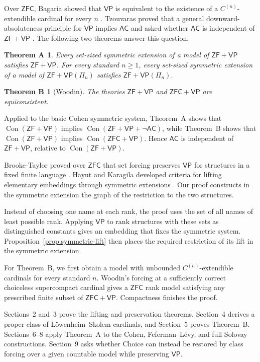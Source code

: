 \documentclass[11pt,a4paper]{amsart}
\newif\ifrevisionblue
\DeclareRobustCommand{\revision}[1]{{\ifrevisionblue\color{blue}\fi#1}}
\newcommand{\VP}{\mathsf{VP}}
\newcommand{\AC}{\mathsf{AC}}
\newcommand{\ZF}{\mathsf{ZF}}
\newcommand{\ZFC}{\mathsf{ZFC}}
\newcommand{\Con}{\operatorname{Con}}
\theoremstyle{plain}
\newtheorem*{thmA}{Theorem A}
\newtheorem*{thmB}{Theorem B}
\theoremstyle{definition}
\theoremstyle{remark}
\begin{document}
Over $\ZFC$, Bagaria showed that $\VP$ is equivalent to the existence of a $C^{(n)}$-extendible cardinal for every $n$ \cite{BagariaCn}.  Tzouvaras proved that a general downward-absoluteness principle for $\VP$ implies $\AC$ and asked whether $\AC$ is independent of $\ZF+\VP$ \cite[Question~4.1]{Tzouvaras}.  The following two theorems answer this question.

\begin{thmA}
Every set-sized symmetric extension of a model of $\ZF+\VP$ satisfies $\ZF+\VP$.  For every standard $n\geq1$, every set-sized symmetric extension of a model of $\ZF+\VP(\Pi_n)$ satisfies $\ZF+\VP(\Pi_n)$.
\end{thmA}

\begin{thmB}[\revision{Woodin}]
The theories $\ZF+\VP$ and $\ZFC+\VP$ are equiconsistent.
\end{thmB}

Applied to the basic Cohen symmetric system, Theorem~A shows that $\Con(\ZF+\VP)$ implies $\Con(\ZF+\VP+\neg\AC)$, while Theorem~B shows that $\Con(\ZF+\VP)$ implies $\Con(\ZFC+\VP)$.  Hence $\AC$ is independent of $\ZF+\VP$, relative to $\Con(\ZF+\VP)$.

Brooke-Taylor proved over $\ZFC$ that set forcing preserves $\VP$ for structures in a fixed finite language \cite[Lemma~23 and Theorem~24]{BrookeTaylor}.  Hayut and Karagila developed criteria for lifting elementary embeddings through symmetric extensions \cite[Theorems~4.7 and~4.9]{HayutKaragila}.  Our proof constructs in the symmetric extension the graph of \revision{the restriction to the two structures}.

Instead of choosing one name at each rank, the proof uses the set of all names of least possible rank.  Applying $\VP$ to rank structures with these sets as distinguished constants gives an embedding that fixes the symmetric system.  Proposition~\ref{prop:symmetric-lift} then places the required restriction of its lift in the symmetric extension.

For Theorem~B, we first obtain a model with unbounded $C^{(n)}$-extendible cardinals for every standard $n$.  Woodin's forcing at a sufficiently correct choiceless supercompact cardinal gives a $\ZFC$ rank model satisfying any prescribed finite subset of $\ZFC+\VP$.  Compactness finishes the proof.

Sections~2 and~3 prove the lifting and preservation theorems.  Section~4 derives a proper class of L\"owenheim--Skolem cardinals, and Section~5 proves Theorem~B.  Sections~6--8 apply Theorem~A to the Cohen, Feferman--L\'evy, and full Solovay constructions.  Section~9 asks whether Choice can instead be restored by class forcing over a given countable model while preserving $\VP$.
\end{document}
